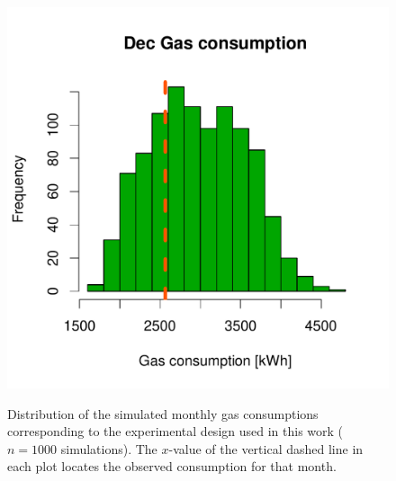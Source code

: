 \documentclass[a4paper, 12pt]{article}
\begin{document}
\begin{figure}
 \includegraphics[width=\scale]{Simulation_histograms/Batch_2_Only/Gas_Runs/Dec_Gas}\\
 \caption{Distribution of the simulated monthly gas
 consumptions corresponding to the experimental design used in this work ($n=1000$ simulations).
 The $x$-value of the vertical dashed line in each plot locates the observed consumption for that month.}
 \label{Fig_Output_Hist}
\end{figure}
\end{document}
